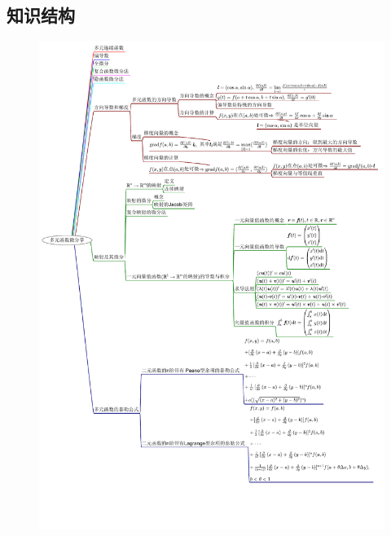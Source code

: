 \documentclass[12pt,UTF8]{ctexart}
\begin{document}
\subsection{知识结构}
\begin{figure}[H]
\begin{center}
\includegraphics[height=0.9\textheight,angle=0]{20190609.pdf}
\end{center}
\end{figure}
\end{document}
